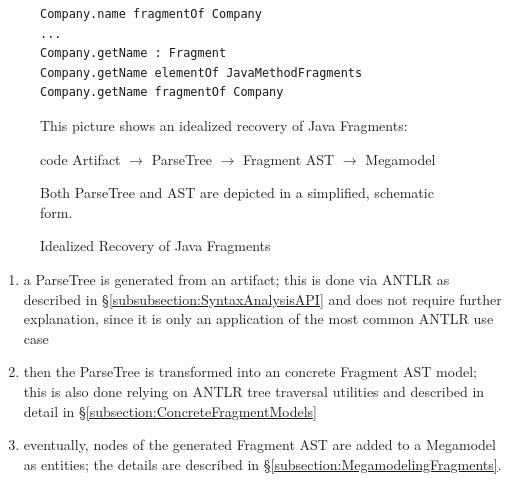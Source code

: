 \begin{figure}[h!]
\begin{center}
\begin{minipage}{0.5\textwidth}
\begin{lstlisting}[numbers=none]
Company.name fragmentOf Company
...
Company.getName : Fragment
Company.getName elementOf JavaMethodFragments
Company.getName fragmentOf Company
\end{lstlisting}
\end{minipage}
\end{center}
{
\scriptsize
This picture shows an idealized recovery of \gls{Java} \glspl{Fragment}:
\begin{center}
code \gls{Artifact}
$\rightarrow$
\gls{ParseTree}
$\rightarrow$
\gls{Fragment} \gls{AST}
$\rightarrow$
\gls{Megamodel}
\end{center} 
Both \gls{ParseTree} and \gls{AST} are depicted in a simplified, schematic form.
}
\caption{Idealized Recovery of Java Fragments}
\label{figure:IdealizedRecoveryOfJavaFragments}
\end{figure}
\begin{enumerate}
\item
a \gls{ParseTree} is generated from an artifact; this is done via \gls{ANTLR} as described in §\ref{subsubsection:SyntaxAnalysisAPI} and does not require further explanation, since it is only an application of the most common \gls{ANTLR} use case
\item
then the \gls{ParseTree} is transformed into an concrete \gls{Fragment} \gls{AST} model; this is also done relying on \gls{ANTLR} tree traversal utilities and described in detail in §\ref{subsection:ConcreteFragmentModels}
\item
eventually, nodes of the generated \gls{Fragment} \gls{AST} are added to a \gls{Megamodel} as entities; the details are described in §\ref{subsection:MegamodelingFragments}.
\end{enumerate}



